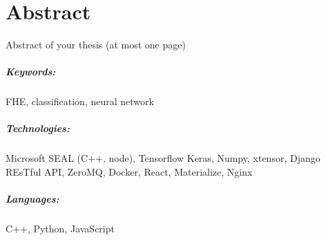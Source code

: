 \chapter*{Abstract}
Abstract of your thesis (at most one page)

\Blindtext[2]

\paragraph{Keywords:}
FHE, classification, neural network

\paragraph{Technologies:}
Microsoft SEAL (C++, node),
Tensorflow Keras,
Numpy,
xtensor,
Django REsTful API,
ZeroMQ,
Docker,
React,
Materialize,
Nginx

\paragraph{Languages:}
C++, Python, JavaScript
